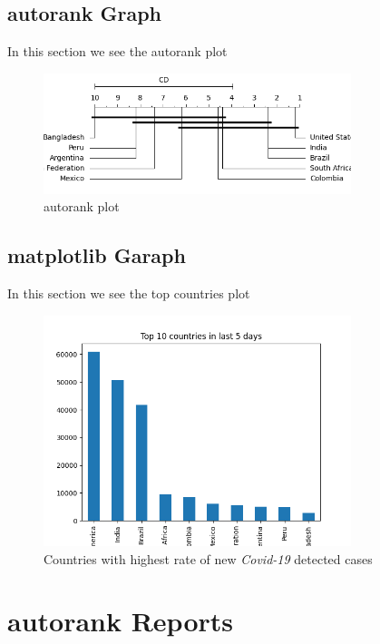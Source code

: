 \documentclass[12pt, letterpaper, twoside]{report}
\begin{document}
\section{autorank Graph}
In this section we see the autorank plot
\begin{figure}[ht]
    \centering
    \includegraphics[width=0.8\textwidth]{autorank.png}
    \caption{autorank plot}
    \label{fig:autorank}
\end{figure} 

\section{matplotlib Garaph}
 In this section we see the top countries plot
\begin{figure}[ht]
    \centering
    \includegraphics[width=0.8\textwidth]{TopCountries.png}
    \caption{Countries with highest rate of new \textit{Covid-19} detected cases}
    \label{fig:TopCountries}
\end{figure}

\chapter{autorank Reports}
 
 \begin{abstract}
  autorank is a simple Python package with one task: simplify the comparison between (multiple) paired populations. This is, for example, required if the performance different machine learning algorithms or simulations should be compared on multiple data sets. The performance measures on each data set are then the paired samples, the difference in the central tendency (e.g., the mean or median) can be used to rank the different algorithms. In \ref{fig:autorank} you can see one output sample of this library
 \end{abstract}
 
\end{document}

